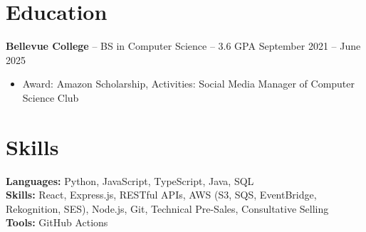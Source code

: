 \documentclass[11pt]{article}       %
\begin{document}

\vspace{-18.5pt}

\section*{Education}
\textbf{Bellevue College} -- BS in Computer Science -- 3.6 GPA \hfill September 2021 -- June 2025\\
\vspace{-9pt}
\begin{itemize}
  \item Award: Amazon Scholarship, Activities: Social Media Manager of Computer Science Club
\end{itemize}

\vspace{-18.5pt}

\section*{Skills}
\textbf{Languages:} Python, JavaScript, TypeScript, Java, SQL\\
\textbf{Skills:} React, Express.js, RESTful APIs, AWS (S3, SQS, EventBridge, Rekognition, SES), Node.js, Git, Technical Pre-Sales, Consultative Selling\\
\textbf{Tools:} GitHub Actions

\vspace{-6.5pt}
\end{document}
